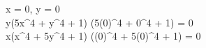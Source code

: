  x = 0, y = 0 \\
y(5x^4 + y^4 + 1) (5(0)^4 + 0^4 + 1) = 0 \\
x(x^4 + 5y^4 + 1) ((0)^4 + 5(0)^4 + 1) = 0